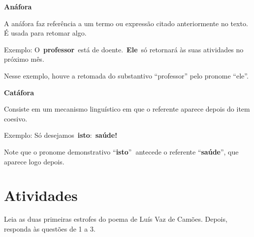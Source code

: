 {\textbf{Anáfora}

A anáfora faz referência a um termo ou expressão citado anteriormente no
texto. É usada para retomar algo.

Exemplo: O~\textbf{professor}~está de doente.~\textbf{Ele}~só retornará
às suas atividades no próximo mês.

Nesse exemplo, houve a retomada do substantivo ``professor'' pelo
pronome ``ele''.

\textbf{Catáfora}

Consiste em um mecanismo linguístico em que o referente aparece depois
do item coesivo.

Exemplo: Só desejamos~\textbf{isto}:~\textbf{saúde!}

Note que o pronome demonstrativo ``\textbf{isto}''\textbf{~}antecede o
referente ``\textbf{saúde}'', que aparece logo depois.
}

\section{Atividades}

Leia as duas primeiras estrofes do poema de Luís Vaz de Camões. Depois,
responda às questões de 1 a 3.



